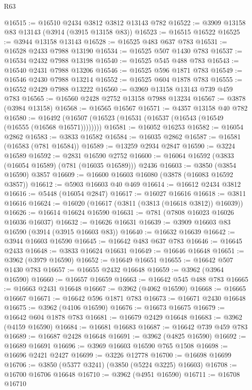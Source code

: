 \begin{lexlean}{R63}
\begin{coremodule}
@16515 := @16510 @2434 @3812 @3812 @13143 @782
@16522 := @3909 @13158 @83 @13143 (@3914 (@3915 @13158 @83))
@16523 := @16515 @16522
@16525 := @3944 @13158 @13143
@16528 := @16525 @483 @637 @783
@16531 := @16528 @2433 @7988 @13190
@16534 := @16525 @507 @1430 @783
@16537 := @16534 @2432 @7988 @13198
@16540 := @16525 @545 @488 @783
@16543 := @16540 @2431 @7988 @13206
@16546 := @16525 @596 @1871 @783
@16549 := @16546 @2430 @7988 @13214
@16552 := @16525 @604 @1878 @783
@16555 := @16552 @2429 @7988 @13222
@16560 := @3969 @13158 @13143 @739 @459 @783
@16565 := @16560 @2428 @2752 @13158 @7988 @13234
@16567 := @3878 (@3984 @13158)
@16568 := @16565 @16567
@16571 := @4357 @13158 @40 @782
@16580 := @16492 (@16507 (@16523 (@16531 (@16537 (@16543 (@16549 (@16555 (@16568 @16571))))))))
@16581 := @16052 @16253
@16582 := @16054 @2862
@16583 := @3833 @16582
@16584 := @16035 @2862
@16587 := @16581 (@16583 (@781 @16584))
@16589 := @13259 @2934 @2847
@16590 := @3224 @16589
@16592 := @2831 @16590 @2752
@16600 := @16064 @16592 (@3833 (@16054 @16589) (@781 (@16035 @16589))) @2436
@16603 := @3850 (@3854 @16590) @3857
@16609 := @16600 @16603 @16080 (@3878 (@16083 @16592 @3857))
@16612 := @5903 @16603 @40 @469
@16614 := @16612 @2434 @3812
@16616 := @5448 (@16054 @2847)
@16617 := @16027 @16616
@16618 := @3811 @16616
@16624 := @16020 (@16617 (@3811 (@3813 (@16618 @3812)) @16039))
@16626 := @16614 @16624 @16590
@16631 := @781 (@7808 @16023 @16026 @16036 @16037)
@16632 := @16626 @16631
@16639 := @3909 @16603 @83 @16590 (@3914 (@3915 @16603 @83))
@16640 := @16632 @16639
@16642 := @3944 @16603 @16590
@16645 := @16642 @483 @637 @783
@16646 := @16645 @2433
@16648 := @3833 @16624 @16631
@16649 := @16646 @16648
@16651 := @3962 (@3979 @16590)
@16652 := @16649 @16651
@16655 := @16642 @507 @1430 @783
@16657 := @16655 @2432 @16648
@16659 := @3962 (@3964 @16590)
@16660 := @16657 @16659
@16663 := @16642 @545 @488 @783
@16665 := @16663 @2431 @16648
@16667 := @3962 (@4062 @16590)
@16668 := @16665 @16667
@16671 := @16642 @596 @1871 @783
@16673 := @16671 @2430 @16648
@16675 := @3962 (@4106 @16590)
@16676 := @16673 @16675
@16679 := @16642 @604 @1878 @783
@16681 := @16679 @2429 @16648
@16683 := @3962 (@4159 @16590)
@16684 := @16681 @16683
@16687 := @16642 @739 @459 @783
@16689 := @16687 @2428 @16648
@16691 := @3962 (@4825 @16590)
@16692 := @16689 @16691
@16696 := @3969 @16603 @16590 @765 @1508
@16698 := @16696 @2421 @2427
@16699 := @3226 @12778
@16700 := @16698 @16699
@16706 := @3850 (@5377 @3241) (@3850 (@5224 @3225) @16603)
@16708 := @16700 @16706 @16648
@16710 := @3962 (@4951 @16590)
@16711 := @16708 @16710

\end{coremodule}
\end{lexlean}
